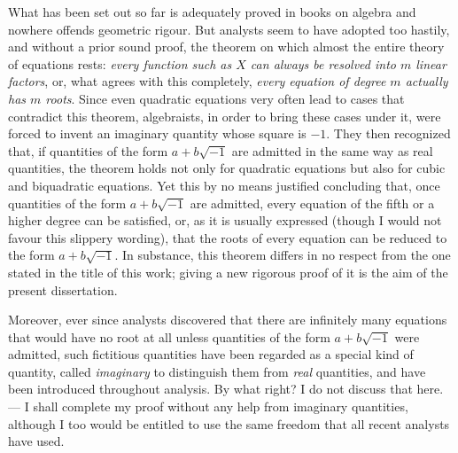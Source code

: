What has been set out so far is adequately proved in books on algebra and nowhere offends geometric rigour. But analysts seem to have adopted too hastily, and without a prior sound proof, the theorem on which almost the entire theory of equations rests: \textit{every function such as $X$ can always be resolved into $m$ linear factors}, or, what agrees with this completely, \textit{every equation of degree $m$ actually has $m$ roots}. Since even quadratic equations very often lead to cases that contradict this theorem, algebraists, in order to bring these cases under it, were forced to invent an imaginary quantity whose square is $-1$. They then recognized that, if quantities of the form $a+b\sqrt{-1}$ are admitted in the same way as real quantities, the theorem holds not only for quadratic equations but also for cubic and biquadratic equations. Yet this by no means justified concluding that, once quantities of the form $a+b\sqrt{-1}$ are admitted, every equation of the fifth or a higher degree can be satisfied, or, as it is usually expressed (though I would not favour this slippery wording), that the roots of every equation can be reduced to the form $a+b\sqrt{-1}$. In substance, this theorem differs in no respect from the one stated in the title of this work; giving a new rigorous proof of it is the aim of the present dissertation.

Moreover, ever since analysts discovered that there are infinitely many equations that would have no root at all unless quantities of the form $a+b\sqrt{-1}$ were admitted, such fictitious quantities have been regarded as a special kind of quantity, called \textit{imaginary} to distinguish them from \textit{real} quantities, and have been introduced throughout analysis. By what right? I do not discuss that here. --- I shall complete my proof without any help from imaginary quantities, although I too would be entitled to use the same freedom that all recent analysts have used.

